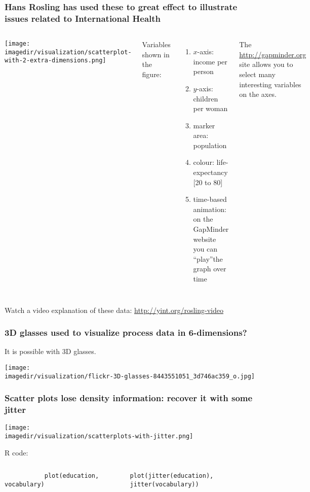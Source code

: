 \begin{frame}\frametitle{Hans Rosling has used these to great effect to illustrate issues related to International Health}
	\begin{columns}[T]
			\centerline{\texttt{[image: \\imagedir/visualization/scatterplot-with-2-extra-dimensions.png]}}
			
			Variables shown in the figure:
			\begin{enumerate}
				\item	$x$-axis: income per person
				\item	$y$-axis: children per woman
				\item	marker area: population
				\item	colour: life-expectancy \scriptsize{[20 to 80]}
				\item	time-based animation: on the GapMinder website you can ``play''the graph over time  
			\end{enumerate}
			The \href{http://gapminder.org}{http://gapminder.org} site allows you to select many interesting variables on the axes.
	\end{columns}
	
	\vspace{10pt}
	Watch a video explanation of these data: \href{http://www.youtube.com/v/jbkSRLYSojo}{http://yint.org/rosling-video} 
\end{frame}

\begin{frame}\frametitle{3D glasses used to visualize process data in 6-dimensions?}
	It is possible with 3D glasses.
	
	\centerline{\texttt{[image: \\imagedir/visualization/flickr-3D-glasses-8443551051\_3d746ac359\_o.jpg]}}
	
\end{frame}


\begin{frame}\frametitle{Scatter plots lose density information: recover it with some jitter}
	\texttt{[image: \\imagedir/visualization/scatterplots-with-jitter.png]}
	
	\vspace{-12pt}
	R code:
	\begin{columns}[T]
			 {\scriptsize \texttt{~~~~~~~~~~~plot(education, vocabulary)}}
			 
			
			
			{\scriptsize \texttt{plot(jitter(education), jitter(vocabulary))}}
	\end{columns}
	
\end{frame}

